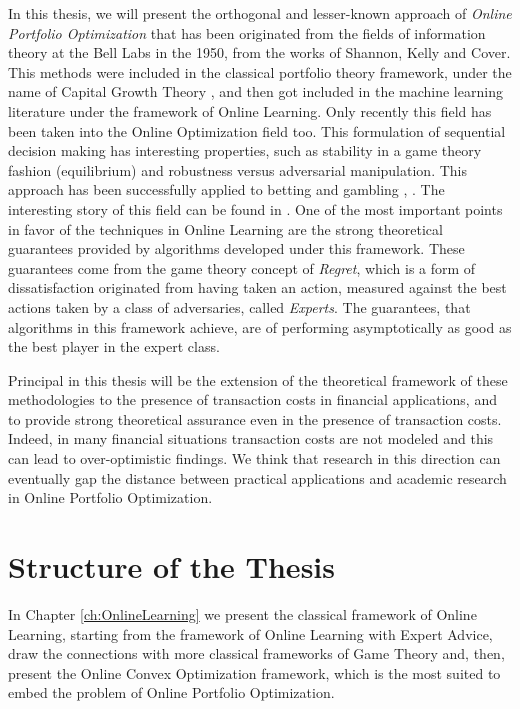 In this thesis, we will present the orthogonal and lesser-known approach of \emph{Online Portfolio Optimization} that has been originated from the fields of information theory at the Bell Labs in the 1950, from the works of Shannon, Kelly and Cover. This methods were included in the classical portfolio theory framework, under the name of Capital Growth Theory \cite{hakansson1995capital}, and then got included in the machine learning literature under the framework of Online Learning. Only recently this field has been taken into the Online Optimization field too. This formulation of sequential decision making has interesting properties, such as stability in a game theory fashion (equilibrium) and robustness versus adversarial manipulation.
This approach has been successfully applied to betting and gambling \cite{thorp1966beat}, \cite{hausch1981efficiency}. The interesting story of this field can be found in \cite{poundstone2010fortune}.
One of the most important points in favor of the techniques in Online Learning are the strong theoretical guarantees provided by algorithms developed under this framework. These guarantees come from the game theory concept of \emph{Regret}, which is a form of dissatisfaction originated from having taken an action, measured against the best actions taken by a class of  adversaries, called \emph{Experts}. The guarantees, that algorithms in this framework achieve, are of performing asymptotically as good as the best player in the expert class.

Principal in this thesis will be the extension of the theoretical framework of these methodologies to the presence of transaction costs in financial applications, and to provide strong theoretical assurance even in the presence of transaction costs. Indeed, in many financial situations transaction costs are not modeled and this can lead to over-optimistic findings. We think that research in this direction can eventually gap the distance between practical applications and academic research in Online Portfolio Optimization.

\section{Structure of the Thesis}

In Chapter \ref{ch:OnlineLearning} we present the classical framework of Online Learning, starting from the framework of Online Learning with Expert Advice, draw the connections with more classical frameworks of Game Theory and, then, present the Online Convex Optimization framework, which is the most suited to embed the problem of Online Portfolio Optimization. 

